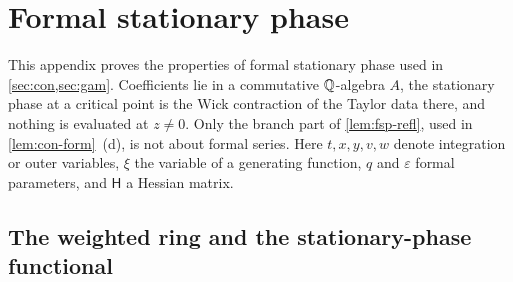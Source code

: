 \section{Formal stationary phase}
\label{sec:fsp}

This appendix proves the properties of formal stationary phase used in \cref{sec:con,sec:gam}. Coefficients lie in a commutative $\mathbb{Q}$-algebra $A$, the stationary phase at a critical point is the Wick contraction of the Taylor data there, and nothing is evaluated at $z\neq0$. Only the branch part of \cref{lem:fsp-refl}, used in \cref{lem:con-form}~(d), is not about formal series. Here $t,x,y,v,w$ denote integration or outer variables, $\xi$ the variable of a generating function, $q$ and $\varepsilon$ formal parameters, and $\mathsf H$ a Hessian matrix.

\subsection{The weighted ring and the stationary-phase functional}
\label{sec:fsp-def}

